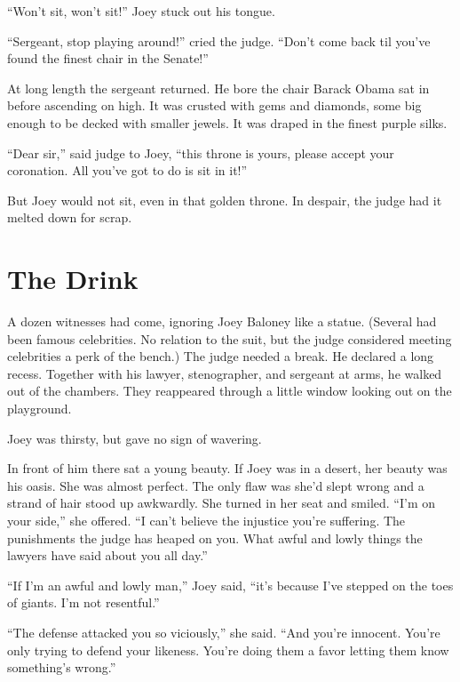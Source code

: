 \documentclass[oneside]{book}
\begin{document}
``Won't sit, won't sit!'' Joey stuck out his tongue.

``Sergeant, stop playing around!'' cried the judge.  ``Don't come back til you've
found the finest chair in the Senate!''

At long length the sergeant returned.  He bore the chair Barack Obama
sat in before ascending on high.  It was crusted with gems and diamonds, some
big enough to be decked with smaller jewels.  It was draped in the finest
purple silks.

``Dear sir,'' said judge to Joey, ``this throne is yours, please accept your
coronation.  All you've got to do is sit in it!''

But Joey would not sit, even in that golden throne.
In despair, the judge had it melted down for scrap.

\chapter{The Drink}

A dozen witnesses had come, ignoring Joey Baloney like a statue.
(Several had been famous celebrities.  No relation
to the suit, but the judge considered
meeting celebrities a perk of the bench.)
The judge needed a break.  He declared a long recess.  Together with his lawyer,
stenographer, and sergeant at arms, he walked out of the chambers.
They reappeared through a little window looking out
on the playground.

Joey was thirsty, but gave no sign of wavering.

In front of him there sat a young beauty.  If Joey was in a desert,
her beauty was his oasis.
She was almost perfect.  The only flaw was she'd slept wrong and a
strand of hair stood up awkwardly.
She turned in her seat and smiled.  ``I'm on your side,''
she offered.  ``I can't believe the injustice you're suffering.  The punishments the
judge has heaped on you.  What awful and lowly things the lawyers have said about you all day.''

``If I'm an awful and lowly man,'' Joey said, ``it's because I've stepped on the toes of giants.
I'm not resentful.''

``The defense attacked you so viciously,'' she said.  ``And you're innocent.
You're only trying to defend your likeness.  You're doing them a favor letting them know
something's wrong.''
\end{document}
